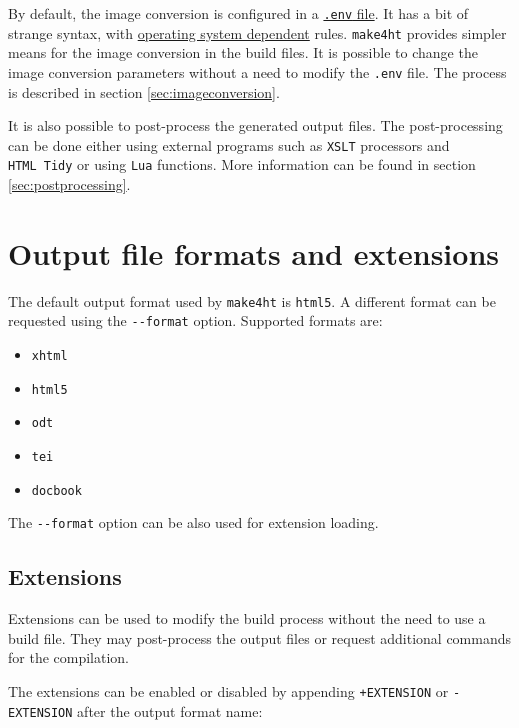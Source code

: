 By default, the image conversion is configured in a
\href{http://www.tug.org/applications/tex4ht/mn35.html\#index35-73001}{\texttt{.env}
file}. It has a bit of strange syntax, with
\href{http://www.tug.org/applications/tex4ht/mn-unix.html\#index27-69005}{operating
system dependent} rules. \texttt{make4ht} provides simpler means for the
image conversion in the build files. It is possible to change the image
conversion parameters without a need to modify the \texttt{.env} file.
The process is described in section \ref{sec:imageconversion}.

It is also possible to post-process the generated output files. The
post-processing can be done either using external programs such as
\texttt{XSLT} processors and \texttt{HTML\ Tidy} or using \texttt{Lua}
functions. More information can be found in section
\ref{sec:postprocessing}.

\hypertarget{output-file-formats-and-extensions}{%
\section{Output file formats and
extensions}\label{output-file-formats-and-extensions}}

The default output format used by \texttt{make4ht} is \texttt{html5}. A
different format can be requested using the \texttt{-\/-format} option.
Supported formats are:

\begin{itemize}
\tightlist
\item
  \texttt{xhtml}
\item
  \texttt{html5}
\item
  \texttt{odt}
\item
  \texttt{tei}
\item
  \texttt{docbook}
\end{itemize}

The \texttt{-\/-format} option can be also used for extension loading.

\hypertarget{extensions}{%
\subsection{Extensions}\label{extensions}}

Extensions can be used to modify the build process without the need to
use a build file. They may post-process the output files or request
additional commands for the compilation.

The extensions can be enabled or disabled by appending
\texttt{+EXTENSION} or \texttt{-EXTENSION} after the output format name:


